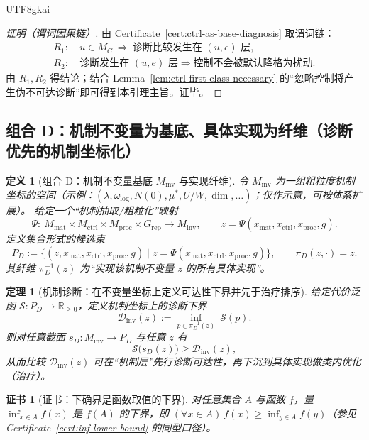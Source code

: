 \documentclass[12pt]{article}
\newtheorem{definition}{定义}[section]
\newtheorem{theorem}{定理}[section]
\newtheorem{certificate}{证书}[section]
\begin{document}
\begin{CJK*}{UTF8}{gkai}
\begin{proof}[证明（谓词因果链）]
由 Certificate~\ref{cert:ctrl-as-base-diagnosis} 取谓词链：
\[
\begin{aligned}
R_1:&\ u\in M_C\ \Rightarrow\ \text{诊断比较发生在 }(u,e)\text{ 层},\\
R_2:&\ \text{诊断发生在 }(u,e)\text{ 层}\Rightarrow \text{控制不会被默认降格为扰动}.
\end{aligned}
\]
由 $R_1,R_2$ 得结论；结合 Lemma~\ref{lem:ctrl-first-class-necessary} 的“忽略控制将产生伪不可达诊断”即可得到本引理主旨。证毕。
\end{proof}

\subsection{组合 D：机制不变量为基底、具体实现为纤维（诊断优先的机制坐标化）}

\begin{definition}[组合 D：机制不变量基底 $M_{\mathrm{inv}}$ 与实现纤维]
\label{def:rtsc-bundle-D}
令 $M_{\mathrm{inv}}$ 为一组粗粒度机制坐标的空间（示例：$(\lambda,\omega_{\log},N(0),\mu^\ast,U/W,\dim,\ldots)$；仅作示意，可按体系扩展）。
给定一个“机制抽取/粗粒化”映射
\[
\Psi:\ M_{\mathrm{mat}}\times M_{\mathrm{ctrl}}\times M_{\mathrm{proc}}\times G_{\mathrm{rep}}\to M_{\mathrm{inv}},
\qquad z=\Psi(x_{\mathrm{mat}},x_{\mathrm{ctrl}},x_{\mathrm{proc}},g).
\]
定义集合形式的候选束
\[
P_D:=\bigl\{(z,x_{\mathrm{mat}},x_{\mathrm{ctrl}},x_{\mathrm{proc}},g)\mid z=\Psi(x_{\mathrm{mat}},x_{\mathrm{ctrl}},
  x_{\mathrm{proc}},g)\bigr\},
\qquad
\pi_D(z,\cdot)=z.
\]
其纤维 $\pi_D^{-1}(z)$ 为“实现该机制不变量 $z$ 的所有具体实现”。
\end{definition}

\begin{theorem}[机制诊断：在不变量坐标上定义可达性下界并先于治疗排序]
\label{thm:diagnosis-on-invariants}
给定代价泛函 $\mathcal{S}:P_D\to\mathbb{R}_{\ge 0}$，定义机制坐标上的诊断下界
\[
\mathcal{D}_{\mathrm{inv}}(z):=\inf_{p\in \pi_D^{-1}(z)}\ \mathcal{S}(p).
\]
则对任意截面 $s_D:M_{\mathrm{inv}}\to P_D$ 与任意 $z$ 有
\[
\mathcal{S}\bigl(s_D(z)\bigr)\ge \mathcal{D}_{\mathrm{inv}}(z),
\]
从而比较 $\mathcal{D}_{\mathrm{inv}}(z)$ 可在“机制层”先行诊断可达性，再下沉到具体实现做类内优化（治疗）。
\end{theorem}

\begin{certificate}[证书：下确界是函数取值的下界]
\label{cert:diagnosis-on-invariants}
对任意集合 $A$ 与函数 $f$，量 $\inf_{x\in A}f(x)$ 是 $f(A)$ 的下界，即 $(\forall x\in A)\ f(x)\ge \inf_{y\in A}f(y)$（参见
  Certificate~\ref{cert:inf-lower-bound} 的同型口径）。
\end{certificate}


\end{CJK*}
\end{document}

